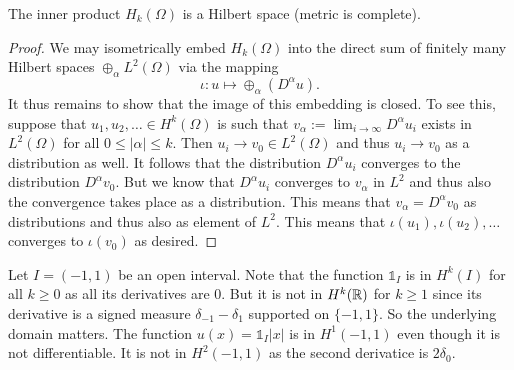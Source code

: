 \documentclass[twoside, a4paper, 10pt]{amsart}
\begin{document}
\begin{lemma} The inner product $H_k(\Omega)$ is a Hilbert space (metric is complete).

\end{lemma}

\begin{proof} We may isometrically embed $H_k(\Omega)$ into the direct sum of finitely many Hilbert spaces $\oplus_{\alpha} L^2(\Omega)$ via the mapping $$\iota:u \mapsto  \oplus_{\alpha} (D^{\alpha}u).$$ It thus remains to show that the image of this embedding is closed. To see this, suppose that $u_1,u_2, \ldots \in H^k(\Omega)$ is such that $v_{\alpha} := \lim_{i \to \infty} D^{\alpha} u_i$ exists in $L^2(\Omega)$ for all $0 \leq |\alpha| \leq k$. Then $u_i \to v_0 \in L^2(\Omega)$ and thus $u_i \to v_0$ as a distribution as well. It follows that the distribution $D^{\alpha} u_i$ converges to the distribution $D^{\alpha} v_0$. But we know that $D^{\alpha} u_i$ converges to $v_{\alpha}$ in $L^2$ and thus also the convergence takes place as a distribution. This means that $v_{\alpha} = D^{\alpha}v_0$ as distributions and thus also as element of $L^2$. This means that $\iota(u_1),\iota(u_2), \ldots $ converges to $\iota(v_0)$ as desired. \end{proof}

\begin{eg} Let $I = (-1,1)$ be an open interval. Note that the function $\mathds{1}_I$ is in $H^k(I)$ for all $k\geq 0$ as all its derivatives are $0$. But it is not in $H^k(\mathbb{R})$ for $k \geq 1$ since its derivative is a signed measure $\delta_{-1} - \delta_{1}$ supported on $\{-1,1\}$. So the underlying domain matters. The function $u(x) = \mathds{1}_I |x|$ is in $H^1(-1,1)$ even though it is not differentiable. It is not in $H^2(-1,1)$ as the second derivatice is $2\delta_{0}$.

\end{eg}
\end{document}
